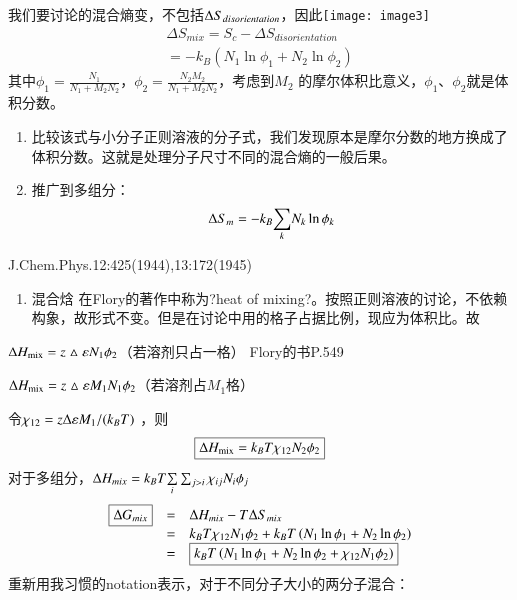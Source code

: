 \documentclass{article} %
\begin{document}
\noindent 我们要讨论的混合熵变，不包括${\rm \Delta }S_{disorientation} $，因此\texttt{[image: image3]}
\[\begin{array}{c} {\boxed{\Delta S_{mix} } =S_{c} -\Delta S_{disorientation} } \\ {\boxed{=-k_{B} (N_{1} \ln \phi _{1} +N_{2} \ln \phi _{2} )} } \end{array}\] 
其中$\phi _{1} =\frac{N_{1} }{N_{1} +M_{2} N_{2} } $，$\phi _{2} =\frac{N_{2} M_{2} }{N_{1} +M_{2} N_{2} } $，考虑到$M_{2} $ 的摩尔体积比意义，$\phi _{1} $、$\phi _{2} $就是体积分数。

\begin{enumerate}
\item  比较该式与小分子正则溶液的分子式，我们发现原本是摩尔分数的地方换成了体积分数。这就是处理分子尺寸不同的混合熵的一般后果。

\item  推广到多组分：
\[{\rm \Delta }S_{m} =-k_{B} {\mathop{\sum }\limits_{k}} N_{k} \ln \phi _{k} \] 
\end{enumerate}
J.Chem.Phys.12:425(1944),13:172(1945)

\begin{enumerate}
\item  混合焓 在Flory的著作中称为?heat of mixing?。按照正则溶液的讨论，不依赖构象，故形式不变。但是在讨论中用的格子占据比例，现应为体积比。故
\end{enumerate}

\noindent ${\rm \Delta }H_{{\rm mix}} =z\vartriangle \varepsilon N_{1} \phi _{2} $（若溶剂只占一格）         Flory的书P.549

\noindent ${\rm \Delta }H_{{\rm mix}} =z\vartriangle \varepsilon M_{1} N_{1} \phi _{2} $（若溶剂占$M_{1} $格）

\noindent 令$\chi _{12} =z{\rm \Delta }\varepsilon M_{1} /(k_{B} T)$ ，则
\[\boxed{{\rm \Delta }H_{{\rm mix}} =k_{B} T\chi _{12} N_{2} \phi _{2} } \] 
对于多组分，${\rm \Delta }H_{mix} =k_{B} T{\mathop{\sum }\limits_{i}} \sum _{j>i}\chi _{ij} N_{i} \phi _{j}  $ 
\[\begin{array}{rcl} {\boxed{{\rm \Delta }G_{mix} } } & {=} & {{\rm \Delta }H_{mix} -T{\rm \Delta }S_{mix} } \\ {} & {=} & {k_{B} T\chi _{12} N_{1} \phi _{2} +k_{B} T\left(N_{1} \ln \phi _{1} +N_{2} \ln \phi _{2} \right)} \\ {} & {=} & {\boxed{k_{B} T\left(N_{1} \ln \phi _{1} +N_{2} \ln \phi _{2} +\chi _{12} N_{1} \phi _{2} \right)} } \end{array}\] 
重新用我习惯的notation表示，对于不同分子大小的两分子混合：
\end{document}
